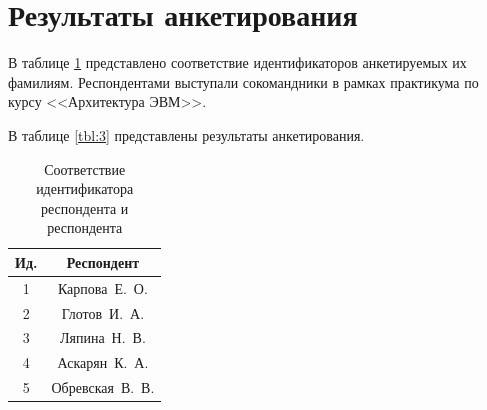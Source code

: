 \section{Результаты анкетирования}
В таблице \ref{tbl:2} представлено соответствие идентификаторов анкетируемых их фамилиям. Респондентами выступали сокомандники в рамках практикума по курсу <<Архитектура ЭВМ>>.

В таблице \ref{tbl:3} представлены результаты анкетирования.

\begin{table}[H]
	\begin{center}
	\caption{Соответствие идентификатора респондента и респондента}
	\label{tbl:2}
	\begin{tabular}{|c|c|}
		\hline
		Ид.  & Респондент      \\ \hline
		1              & Карпова~Е.~О.    \\ \hline
		2              & Глотов~И.~А.   \\ \hline
		3              & Ляпина~Н.~В.    \\ \hline
		4              & Аскарян~К.~А.   \\ \hline
		5              & Обревская~В.~В. \\ \hline
	\end{tabular}
	\end{center}
\end{table}

